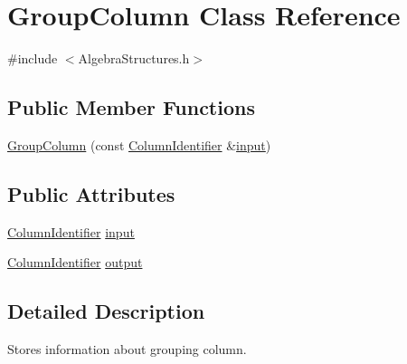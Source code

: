 \hypertarget{class_group_column}{\section{Group\+Column Class Reference}
\label{class_group_column}
}


{\ttfamily \#include $<$Algebra\+Structures.\+h$>$}

\subsection*{Public Member Functions}
\begin{DoxyCompactItemize}
\item 
\hyperlink{class_group_column_a6b48cfe01058e5c5a06e2882d329b5ca}{Group\+Column} (const \hyperlink{class_column_identifier}{Column\+Identifier} \&\hyperlink{class_group_column_a2bcc2e12a33f7a9b47633f2b87ebc68b}{input})
\end{DoxyCompactItemize}
\subsection*{Public Attributes}
\begin{DoxyCompactItemize}
\item 
\hyperlink{class_column_identifier}{Column\+Identifier} \hyperlink{class_group_column_a2bcc2e12a33f7a9b47633f2b87ebc68b}{input}
\item 
\hyperlink{class_column_identifier}{Column\+Identifier} \hyperlink{class_group_column_a512e089dfed68312aeadfcbdd1b80a21}{output}
\end{DoxyCompactItemize}


\subsection{Detailed Description}
Stores information about grouping column. 

